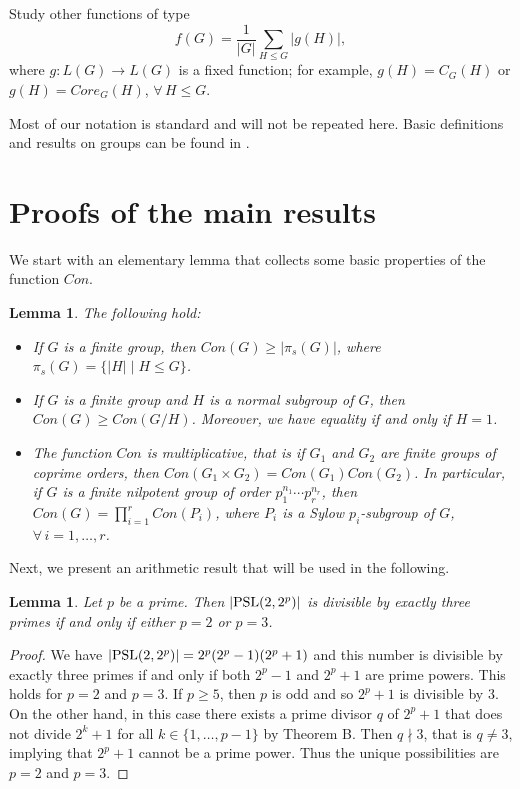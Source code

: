 \documentclass[12pt]{article}
\newtheorem{lemma}[theorem]{Lemma}
\newcommand{\0}{{\leqno}}
\begin{document}
 Study other functions of type
\begin{equation}
f(G)=\frac{1}{|G|}\sum_{H\leq G}|g(H)|,\nonumber
\end{equation}where $g:L(G)\longrightarrow L(G)$ is a fixed function; for example, $g(H)=C_G(H)$ or $g(H)=Core_G(H)$, $\forall\, H\leq G$.
\bigskip

Most of our notation is standard and will not be repeated here. Basic definitions and results on groups can be found in \cite{16}.

\section{Proofs of the main results}

We start with an elementary lemma that collects some basic properties of the function $Con$.

\begin{lemma}
    The following hold:
\begin{itemize}
\item[{\rm a)}] If $G$ is a finite group, then $Con(G)\geq|\pi_s(G)|$, where $\pi_s(G)=\{|H|\mid H\leq G\}$.
\item[{\rm b)}] If $G$ is a finite group and $H$ is a normal subgroup of $G$, then $Con(G)\geq Con(G/H)$. Moreover, we have equality if and only if $H=1$. 
\item[{\rm c)}] The function $Con$ is multiplicative, that is if $G_1$ and $G_2$ are finite groups of coprime orders, then $Con(G_1\times G_2)=Con(G_1)Con(G_2)$. In par\-ti\-cu\-lar, if $G$ is a finite nilpotent group of order $p_1^{n_1}\cdots p_r^{n_r}$, then $Con(G)=\prod_{i=1}^rCon(P_i)$, where $P_i$ is a Sylow $p_i$-subgroup of $G$, $\forall\, i=1, \dots, r$.
\end{itemize}
\end{lemma}

Next, we present an arithmetic result that will be used in the following.

\begin{lemma}
Let $p$ be a prime. Then $|{\rm PSL}(2,2^p)|$ is divisible by exactly three primes if and only if either $p=2$ or $p=3$.
\end{lemma}

\begin{proof}
We have $|{\rm PSL}(2,2^p)|=2^p(2^p-1)(2^p+1)$ and this number is divisible by exactly three primes if and only if both $2^p-1$ and $2^p+1$ are prime powers. This holds for $p=2$ and $p=3$. If $p\geq 5$, then $p$ is odd and so $2^p+1$ is divisible by $3$. On the other hand, in this case there exists a prime divisor $q$ of $2^p+1$ that does not divide $2^k+1$ for all $k\in\{1, \dots, p-1\}$ by Theorem B. Then $q\nmid 3$, that is $q\neq 3$, implying that $2^p+1$ cannot be a prime power. Thus the unique possibilities are $p=2$ and $p=3$.\qedhere
\end{proof}
\end{document}
